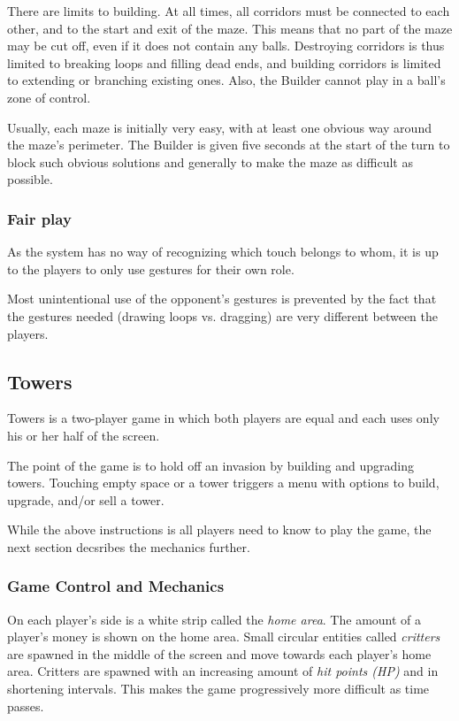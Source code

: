 \documentclass[a4paper,12pt]{article}
\begin{document}
There are limits to building.
At all times, all corridors must be connected to each other, and to the start
and exit of the maze.
This means that no part of the maze may be cut off, even if it does not contain
any balls.
Destroying corridors is thus limited to breaking loops and filling dead ends,
and building corridors is limited to extending or branching existing ones.
Also, the Builder cannot play in a ball's zone of control.

Usually, each maze is initially very easy, with at least one obvious way
around the maze's perimeter.
The Builder is given five seconds at the start of the turn to block such
obvious solutions and generally to make the maze as difficult as possible.

\subsubsection{Fair play}

As the system has no way of recognizing which touch belongs to whom,
it is up to the players to only use gestures for their own role.

Most unintentional use of the opponent's gestures is prevented by the fact that
the gestures needed (drawing loops vs. dragging) are very different between the
players.

\subsection{Towers}

Towers is a two-player game in which both players are equal and each uses
only his or her half of the screen.

The point of the game is to hold off an invasion by building and upgrading
towers.
Touching empty space or a tower triggers a menu with options to build, upgrade,
and/or sell a tower.

While the above instructions is all players need to know to play the game,
the next section decsribes the mechanics further.

\subsubsection{Game Control and Mechanics}

On each player's side is a white strip called the \emph{home area}. The amount
of a player's money is shown on the home area.
Small circular entities called \emph{critters} are spawned in the middle of the
screen and move towards each player's home area.
Critters are spawned with an increasing amount of \emph{hit points (HP)} and
in shortening intervals.
This makes the game progressively more difficult as time passes.
\end{document}

